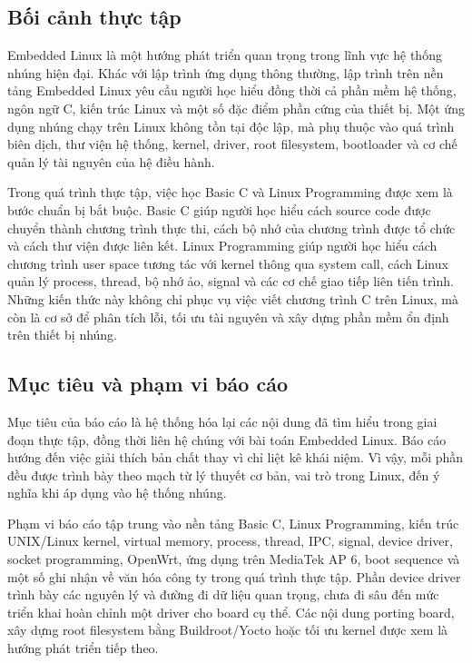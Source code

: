 \documentclass[11pt]{article}
\begin{document}
\subsection{Bối cảnh thực tập}

Embedded Linux là một hướng phát triển quan trọng trong lĩnh vực hệ thống nhúng hiện đại. Khác với lập trình ứng dụng thông thường, lập trình trên nền tảng Embedded Linux yêu cầu người học hiểu đồng thời cả phần mềm hệ thống, ngôn ngữ C, kiến trúc Linux và một số đặc điểm phần cứng của thiết bị. Một ứng dụng nhúng chạy trên Linux không tồn tại độc lập, mà phụ thuộc vào quá trình biên dịch, thư viện hệ thống, kernel, driver, root filesystem, bootloader và cơ chế quản lý tài nguyên của hệ điều hành.

Trong quá trình thực tập, việc học Basic C và Linux Programming được xem là bước chuẩn bị bắt buộc. Basic C giúp người học hiểu cách source code được chuyển thành chương trình thực thi, cách bộ nhớ của chương trình được tổ chức và cách thư viện được liên kết. Linux Programming giúp người học hiểu cách chương trình user space tương tác với kernel thông qua system call, cách Linux quản lý process, thread, bộ nhớ ảo, signal và các cơ chế giao tiếp liên tiến trình. Những kiến thức này không chỉ phục vụ việc viết chương trình C trên Linux, mà còn là cơ sở để phân tích lỗi, tối ưu tài nguyên và xây dựng phần mềm ổn định trên thiết bị nhúng.

\subsection{Mục tiêu và phạm vi báo cáo}

Mục tiêu của báo cáo là hệ thống hóa lại các nội dung đã tìm hiểu trong giai đoạn thực tập, đồng thời liên hệ chúng với bài toán Embedded Linux. Báo cáo hướng đến việc giải thích bản chất thay vì chỉ liệt kê khái niệm. Vì vậy, mỗi phần đều được trình bày theo mạch từ lý thuyết cơ bản, vai trò trong Linux, đến ý nghĩa khi áp dụng vào hệ thống nhúng.

Phạm vi báo cáo tập trung vào nền tảng Basic C, Linux Programming, kiến trúc UNIX/Linux kernel, virtual memory, process, thread, IPC, signal, device driver, socket programming, OpenWrt, ứng dụng trên MediaTek AP 6, boot sequence và một số ghi nhận về văn hóa công ty trong quá trình thực tập. Phần device driver trình bày các nguyên lý và đường đi dữ liệu quan trọng, chưa đi sâu đến mức triển khai hoàn chỉnh một driver cho board cụ thể. Các nội dung porting board, xây dựng root filesystem bằng Buildroot/Yocto hoặc tối ưu kernel được xem là hướng phát triển tiếp theo.
\end{document}
